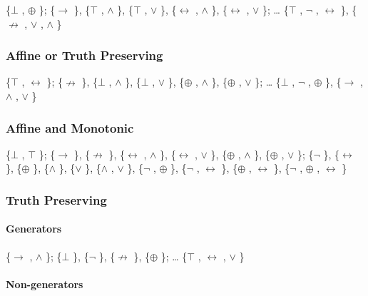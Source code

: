 \{$\bot$ , $\oplus$ \}; \{$\to$ \}, \{$\top$ , $\land$ \}, \{$\top$ , $\lor$ \}, \{$\leftrightarrow$ , $\land$ \}, \{$\leftrightarrow$ , $\lor$ \}; \ldots{} \{$\top$ ,
$\neg$ , $\leftrightarrow$ \}, \{$\nrightarrow$ , $\lor$ , $\land$ \}

\hypertarget{affine-or-truth-preserving}{%
\subsubsection{Affine or Truth
Preserving}\label{affine-or-truth-preserving}}

\{$\top$ , $\leftrightarrow$ \}; \{$\nrightarrow$ \}, \{$\bot$ , $\land$ \}, \{$\bot$ , $\lor$ \}, \{$\oplus$ , $\land$ \}, \{$\oplus$ , $\lor$ \}; \ldots{} \{$\bot$ ,
$\neg$ , $\oplus$ \}, \{$\to$ , $\land$ , $\lor$ \}

\hypertarget{affine-and-monotonic}{%
\subsubsection{Affine and Monotonic}\label{affine-and-monotonic}}

\{$\bot$ , $\top$ \}; \{$\to$ \}, \{$\nrightarrow$ \}, \{$\leftrightarrow$ , $\land$ \}, \{$\leftrightarrow$ , $\lor$ \}, \{$\oplus$ , $\land$ \}, \{$\oplus$ , $\lor$ \}; \{$\neg$ \},
\{$\leftrightarrow$ \}, \{$\oplus$ \}, \{$\land$ \}, \{$\lor$ \}, \{$\land$ , $\lor$ \}, \{$\neg$ , $\oplus$ \}, \{$\neg$ , $\leftrightarrow$ \}, \{$\oplus$ , $\leftrightarrow$ \}, \{$\neg$ ,
$\oplus$ , $\leftrightarrow$ \}

\hypertarget{truth-preserving}{%
\subsubsection{Truth Preserving}\label{truth-preserving}}

\hypertarget{generators}{%
\paragraph{Generators}\label{generators}}

\{$\to$ , $\land$ \}; \{$\bot$ \}, \{$\neg$ \}, \{$\nrightarrow$ \}, \{$\oplus$ \}; \ldots{} \{$\top$ , $\leftrightarrow$ , $\lor$ \}

\hypertarget{non-generators}{%
\paragraph{Non-generators}\label{non-generators}}

